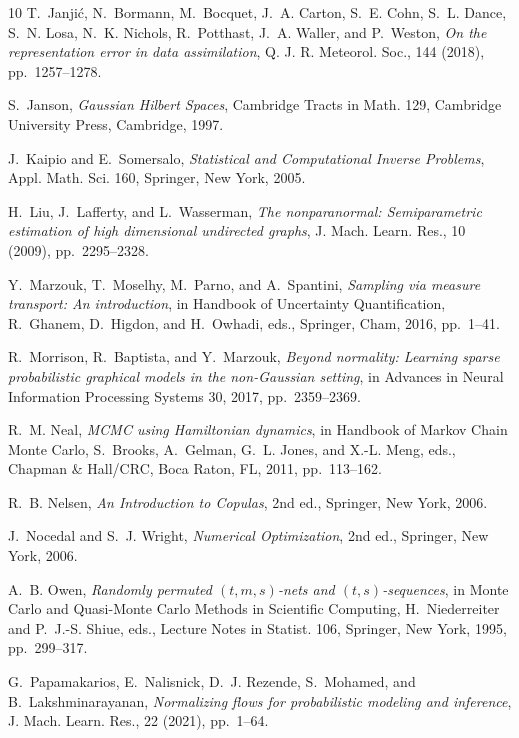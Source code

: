 \begin{thebibliography}{10}
{\sc T.~Janji\'c, N.~Bormann, M.~Bocquet, J.~A. Carton, S.~E. Cohn, S.~L. Dance, S.~N. Losa, N.~K. Nichols, R.~Potthast, J.~A. Waller, and P.~Weston}, {\em On the representation error in data assimilation}, Q. J. R. Meteorol. Soc., 144 (2018), pp.~1257--1278.

{\sc S.~Janson}, {\em Gaussian Hilbert Spaces}, Cambridge Tracts in Math. 129, Cambridge University Press, Cambridge, 1997.

{\sc J.~Kaipio and E.~Somersalo}, {\em Statistical and Computational Inverse Problems}, Appl. Math. Sci. 160, Springer, New York, 2005.

{\sc H.~Liu, J.~Lafferty, and L.~Wasserman}, {\em The nonparanormal: Semiparametric estimation of high dimensional undirected graphs}, J. Mach. Learn. Res., 10 (2009), pp.~2295--2328.

{\sc Y.~Marzouk, T.~Moselhy, M.~Parno, and A.~Spantini}, {\em Sampling via measure transport: An introduction}, in Handbook of Uncertainty Quantification, R.~Ghanem, D.~Higdon, and H.~Owhadi, eds., Springer, Cham, 2016, pp.~1--41.

{\sc R.~Morrison, R.~Baptista, and Y.~Marzouk}, {\em Beyond normality: Learning sparse probabilistic graphical models in the non-{G}aussian setting}, in Advances in Neural Information Processing Systems 30, 2017, pp.~2359--2369.

{\sc R.~M. Neal}, {\em {MCMC} using {H}amiltonian dynamics}, in Handbook of Markov Chain Monte Carlo, S.~Brooks, A.~Gelman, G.~L. Jones, and X.-L. Meng, eds., Chapman \& Hall/CRC, Boca Raton, FL, 2011, pp.~113--162.

{\sc R.~B. Nelsen}, {\em An Introduction to Copulas}, 2nd ed., Springer, New York, 2006.

{\sc J.~Nocedal and S.~J. Wright}, {\em Numerical Optimization}, 2nd ed., Springer, New York, 2006.

{\sc A.~B. Owen}, {\em Randomly permuted $(t,m,s)$-nets and $(t,s)$-sequences}, in Monte Carlo and Quasi-Monte Carlo Methods in Scientific Computing, H.~Niederreiter and P.~J.-S. Shiue, eds., Lecture Notes in Statist. 106, Springer, New York, 1995, pp.~299--317.

{\sc G.~Papamakarios, E.~Nalisnick, D.~J. Rezende, S.~Mohamed, and B.~Lakshminarayanan}, {\em Normalizing flows for probabilistic modeling and inference}, J. Mach. Learn. Res., 22 (2021), pp.~1--64.


\end{thebibliography}

